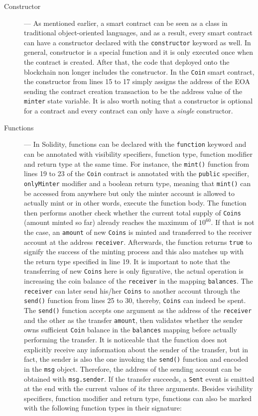 \begin{description}
\item[Constructor] --- As mentioned earlier, a smart contract can be seen as a class in traditional object-oriented languages, and as a result, every smart contract can have a constructor declared with the \texttt{constructor} keyword as well. In general, constructor is a special function and it is only executed once when the contract is created. After that, the code that deployed onto the blockchain non longer includes the constructor. In the \texttt{Coin} smart contract, the constructor from lines 15 to 17 simply assigns the address of the EOA sending the contract creation transaction to be the address value of the \texttt{minter} state variable.
	It is also worth noting that a constructor is optional for a contract and every contract can only have a \textit{single} constructor. 

\item[Functions] --- In Solidity, functions can be declared with the \texttt{function} keyword and can be annotated with visibility specifiers, function type, function modifier and return type at the same time. For instance, the \texttt{mint()} function from lines 19 to 23 of the \texttt{Coin} contract is annotated with the \texttt{public} specifier, \texttt{onlyMinter} modifier and a boolean return type, meaning that \texttt{mint()} can be accessed from anywhere but only the minter account is allowed to actually mint or in other words, execute the function body. The function then performs another check whether the current total supply of \texttt{Coins} (amount minted so far) already reaches the maximum of $10^{60}$. If that is not the case, an \texttt{amount} of new \texttt{Coins} is minted and transferred to the receiver account at the address \texttt{receiver}. Afterwards, the function returns \texttt{true} to signify the success of the minting process and this also matches up with the return type specified in line 19. It is important to note that the transferring of new \texttt{Coins} here is only figurative, the actual operation is increasing the coin balance of the \texttt{receiver} in the mapping \texttt{balances}. The \texttt{receiver} can later send his/her \texttt{Coins} to another account through the \texttt{send()} function from lines 25 to 30, thereby, \texttt{Coins} can indeed be spent. The \texttt{send()} function accepts one argument as the address of the \texttt{receiver} and the other as the transfer \texttt{amount}, then validates whether the sender owns sufficient \texttt{Coin} balance in the \texttt{balances} mapping before actually performing the transfer. It is noticeable that the function does not explicitly receive any information about the sender of the transfer, but in fact, the sender is also the one invoking the \texttt{send()} function and encoded in the \texttt{msg} object. Therefore, the address of the sending account can be obtained with \texttt{msg.sender}. If the transfer succeeds, a \texttt{Sent} event is emitted at the end with the current values of its three arguments. Besides visibility specifiers, function modifier and return type, functions can also be marked with the following function types in their signature:


\end{description}
